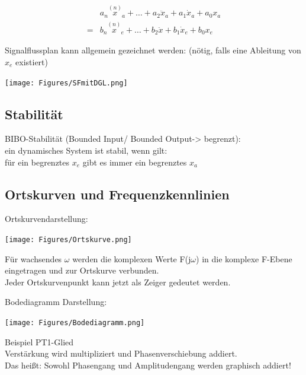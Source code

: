 \begin{align*}
	  & a_{n} \overset{(n)}{x}_{a}+\ldots+a_{2} \ddot{x}_{a}+a_{1} \dot{x}_{a}+a_{0} x_{a} \\
	= & b_{n} \overset{(n)}{x}_{e}+\ldots+b_{2} \ddot{x}+b_{1} \dot{x}_{e}+b_{0} x_{e}
\end{align*}

Signalflussplan kann allgemein gezeichnet werden: (nötig, falls eine Ableitung von $x_e$ existiert)

\texttt{[image: Figures/SFmitDGL.png]}

\subsection{Stabilität}
\begin{mdframed}[style=exercise]
	BIBO-Stabilität (Bounded Input/ Bounded Output-> begrenzt):\\
	ein dynamisches System ist stabil, wenn gilt:\\
	für ein begrenztes $x_e$ gibt es immer ein begrenztes $x_a$
\end{mdframed}

\subsection{Ortskurven und Frequenzkennlinien}

Ortskurvendarstellung:
\begin{center}
	\texttt{[image: Figures/Ortskurve.png]}
\end{center}
\begin{mdframed}[style=exercise]
	Für wachsendes $\omega$ werden die komplexen Werte F(j$\omega$) in die
	komplexe F-Ebene eingetragen und zur Ortskurve verbunden.\\ Jeder
	Ortskurvenpunkt kann jetzt als Zeiger gedeutet werden.
\end{mdframed}

\newpage
Bodediagramm Darstellung:
\begin{center}
	\texttt{[image: Figures/Bodediagramm.png]}
\end{center}
\begin{mdframed}[style=exercise]



	Beispiel PT1-Glied\\
	Verstärkung wird multipliziert und Phasenverschiebung addiert.\\ Das
	heißt: Sowohl Phasengang und Amplitudengang werden graphisch addiert!
\end{mdframed}

